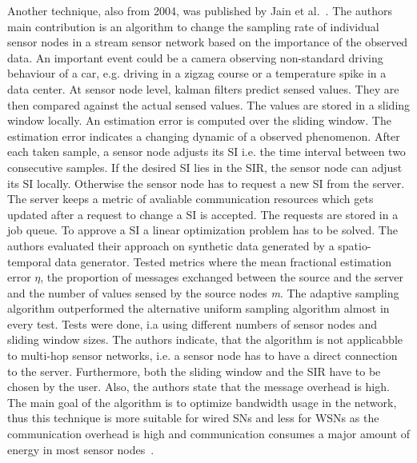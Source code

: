 Another technique, also from 2004, was published by Jain et
al.~\cite{jain2004adaptive}. The authors main contribution is an algorithm to
change the sampling rate of individual sensor nodes in a stream sensor network
based on the importance of the observed data. An important event could be a
camera observing non-standard driving behaviour of a car, e.g. driving in a
zigzag course or a temperature spike in a data center. At sensor node level,
kalman filters predict sensed values. They are then compared against the actual
sensed values. The values are stored in a sliding window locally. An estimation
error is computed over the sliding window. The estimation error indicates a
changing dynamic of a observed phenomenon. After each taken sample, a sensor
node adjusts its \ac{SI} i.e. the time interval between two consecutive
samples. If the desired \ac{SI} lies in the \ac{SIR}, the sensor node can
adjust its \ac{SI} locally. Otherwise the sensor node has to request a new
\ac{SI} from the server. The server keeps a metric of avaliable communication
resources which gets updated after a request to change a \ac{SI} is accepted.
The requests are stored in a job queue. To approve a \ac{SI} a linear
optimization problem has to be solved. The authors evaluated their approach on
synthetic data generated by a spatio-temporal data generator. Tested metrics
where the mean fractional estimation error $ \eta $, the proportion of messages
exchanged between the source and the server and the number of values sensed by
the source nodes \textit{m}. The adaptive sampling algorithm outperformed the
alternative uniform sampling algorithm almost in every test. Tests were done,
i.a using different numbers of sensor nodes and sliding window sizes. The
authors indicate, that the algorithm is not applicabble to multi-hop sensor
networks, i.e. a sensor node has to have a direct connection to the server.
Furthermore, both the sliding window and the \ac{SIR} have to be chosen by the
user. Also, the authors state that the message overhead is high. The main goal
of the algorithm is to optimize bandwidth usage in the network, thus this
technique is more suitable for wired \acp{SN} and less for \acp{WSN} as the
communication overhead is high and communication consumes a major amount of
energy in most sensor nodes~\cite{raghunathan2002energy}.

\par

